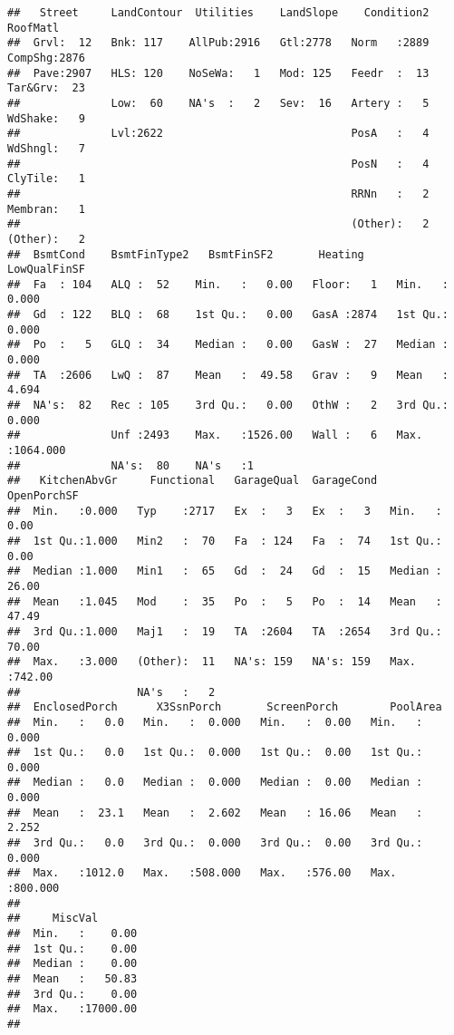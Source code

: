 \documentclass[
]{article}
\newenvironment{Shaded}{\begin{snugshade}}{\end{snugshade}}
\newcommand{\KeywordTok}[1]{\textcolor[rgb]{0.13,0.29,0.53}{\textbf{#1}}}
\newcommand{\NormalTok}[1]{#1}
\newcommand{\OperatorTok}[1]{\textcolor[rgb]{0.81,0.36,0.00}{\textbf{#1}}}
\newcommand{\StringTok}[1]{\textcolor[rgb]{0.31,0.60,0.02}{#1}}
\begin{document}
\begin{Shaded}
\end{Shaded}

\begin{verbatim}
##   Street     LandContour  Utilities    LandSlope    Condition2      RoofMatl   
##  Grvl:  12   Bnk: 117    AllPub:2916   Gtl:2778   Norm   :2889   CompShg:2876  
##  Pave:2907   HLS: 120    NoSeWa:   1   Mod: 125   Feedr  :  13   Tar&Grv:  23  
##              Low:  60    NA's  :   2   Sev:  16   Artery :   5   WdShake:   9  
##              Lvl:2622                             PosA   :   4   WdShngl:   7  
##                                                   PosN   :   4   ClyTile:   1  
##                                                   RRNn   :   2   Membran:   1  
##                                                   (Other):   2   (Other):   2  
##  BsmtCond    BsmtFinType2   BsmtFinSF2       Heating      LowQualFinSF     
##  Fa  : 104   ALQ :  52    Min.   :   0.00   Floor:   1   Min.   :   0.000  
##  Gd  : 122   BLQ :  68    1st Qu.:   0.00   GasA :2874   1st Qu.:   0.000  
##  Po  :   5   GLQ :  34    Median :   0.00   GasW :  27   Median :   0.000  
##  TA  :2606   LwQ :  87    Mean   :  49.58   Grav :   9   Mean   :   4.694  
##  NA's:  82   Rec : 105    3rd Qu.:   0.00   OthW :   2   3rd Qu.:   0.000  
##              Unf :2493    Max.   :1526.00   Wall :   6   Max.   :1064.000  
##              NA's:  80    NA's   :1                                        
##   KitchenAbvGr     Functional   GarageQual  GarageCond   OpenPorchSF    
##  Min.   :0.000   Typ    :2717   Ex  :   3   Ex  :   3   Min.   :  0.00  
##  1st Qu.:1.000   Min2   :  70   Fa  : 124   Fa  :  74   1st Qu.:  0.00  
##  Median :1.000   Min1   :  65   Gd  :  24   Gd  :  15   Median : 26.00  
##  Mean   :1.045   Mod    :  35   Po  :   5   Po  :  14   Mean   : 47.49  
##  3rd Qu.:1.000   Maj1   :  19   TA  :2604   TA  :2654   3rd Qu.: 70.00  
##  Max.   :3.000   (Other):  11   NA's: 159   NA's: 159   Max.   :742.00  
##                  NA's   :   2                                           
##  EnclosedPorch      X3SsnPorch       ScreenPorch        PoolArea      
##  Min.   :   0.0   Min.   :  0.000   Min.   :  0.00   Min.   :  0.000  
##  1st Qu.:   0.0   1st Qu.:  0.000   1st Qu.:  0.00   1st Qu.:  0.000  
##  Median :   0.0   Median :  0.000   Median :  0.00   Median :  0.000  
##  Mean   :  23.1   Mean   :  2.602   Mean   : 16.06   Mean   :  2.252  
##  3rd Qu.:   0.0   3rd Qu.:  0.000   3rd Qu.:  0.00   3rd Qu.:  0.000  
##  Max.   :1012.0   Max.   :508.000   Max.   :576.00   Max.   :800.000  
##                                                                       
##     MiscVal        
##  Min.   :    0.00  
##  1st Qu.:    0.00  
##  Median :    0.00  
##  Mean   :   50.83  
##  3rd Qu.:    0.00  
##  Max.   :17000.00  
## 
\end{verbatim}
\end{document}

